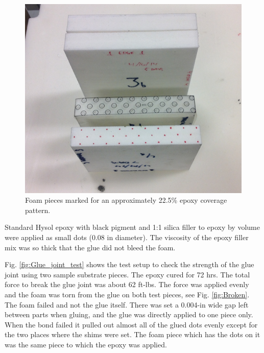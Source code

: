 \begin{figure}[ht]
    \centering
    \includegraphics[width=1.0\linewidth]{images/Pattern.png}
    \caption{Foam pieces marked for an approximately 22.5\% epoxy coverage pattern.}
    \label{fig:Pattern}
\end{figure}

Standard Hysol epoxy with black pigment and 1:1 silica filler to epoxy by volume were applied as small dots (0.08 in diameter). The viscosity of the epoxy filler mix was so thick that the glue did not bleed the foam. 

Fig. \ref{fig:Glue_joint_test} shows the test setup to check the strength of the glue joint using two sample substrate pieces. The epoxy cured for 72 hrs. The total force to break the glue joint  was about 62 ft-lbs. The force was applied evenly and the foam was torn from the glue on both test pieces, see Fig. \ref{fig:Broken}. The foam failed and not the glue itself. There was set a 0.004-in wide gap left between parts when gluing, and the glue was directly applied to one piece only. When the bond failed it pulled out almost all of the glued dots evenly except for the two places where the shims were set. The foam piece which has the dots on it was the same piece to which the epoxy was applied.

